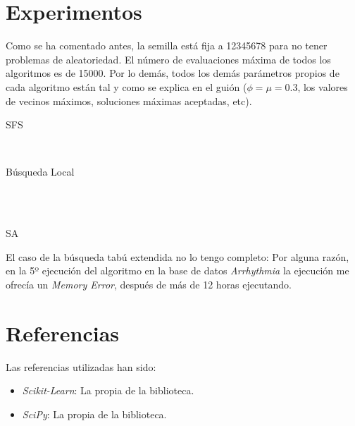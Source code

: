 \documentclass[a4paper, 11pt]{article}
\begin{document}
  \section{Experimentos}
    Como se ha comentado antes, la semilla está fija a 12345678 para no tener problemas de aleatoriedad. El número de evaluaciones máxima de todos los algoritmos es de 15000. Por lo demás, todos los demás parámetros propios de cada algoritmo están tal y como se explica en el guión ($\phi=\mu=0.3$, los valores de vecinos máximos, soluciones máximas aceptadas, etc). \\

    \centerline{SFS}
    
    \\ \centerline{Búsqueda Local}
    \\
    \\ \centerline{SA}
    

    El caso de la búsqueda tabú extendida no lo tengo completo: Por alguna razón, en la 5º ejecución del algoritmo en la base de datos \emph{Arrhythmia} la ejecución me ofrecía un \emph{Memory Error}, después de más de 12 horas ejecutando.

  \section{Referencias}

  Las referencias utilizadas han sido:
  \begin{itemize}
    \item \emph{Scikit-Learn}: La propia  de la biblioteca.
    \item \emph{SciPy}: La propia  de la biblioteca.
  \end{itemize}
\end{document}
